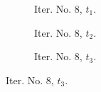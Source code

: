 \documentclass[a4paper,12pt]{amsart}
\numberwithin{equation}{section}
\begin{document}
\begin{figure}[h!]
\begin{subfigure}[t]{0.23\textwidth}
    \caption{Iter. No. 8, $t_1$.}
\end{subfigure}
	\hfill
\begin{subfigure}[t]{0.23\textwidth}
    \caption{Iter. No. 8, $t_2$.}
\end{subfigure}
	\hfill
\begin{subfigure}[t]{0.23\textwidth}
    \caption{Iter. No. 8, $t_3$.}
\end{subfigure}	


\end{figure}
\end{document}
